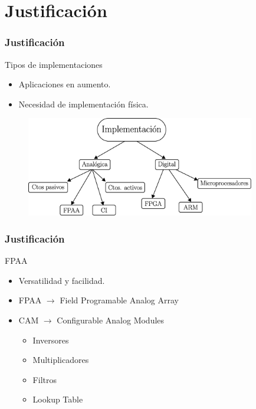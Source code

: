 \documentclass[10pt]{beamer}
\begin{document}
	\section{Justificación}
	\begin{frame}
		\frametitle{Justificación}
		\begin{block}{Tipos de implementaciones}
		\begin{itemize}
			\item Aplicaciones en aumento.
			\item Necesidad de implementación física.
		\end{itemize}
			\begin{figure}[hbtp]
			\centering
			\includegraphics[width = 10cm]{A4_implementacion.eps}
		\end{figure}
		\end{block}
	\end{frame}
	
	
	\begin{frame}
		\frametitle{Justificación}
		\begin{block}{FPAA}
			\begin{itemize}
				\item Versatilidad y facilidad.
				\item FPAA $\to$ Field Programable Analog Array
				\item CAM $\to$ Configurable Analog Modules
				\begin{itemize}
					\item Inversores
					\item Multiplicadores
					\item Filtros
					\item Lookup Table
				\end{itemize}
			\end{itemize}
		\end{block}
	\end{frame}	
	
\end{document}
